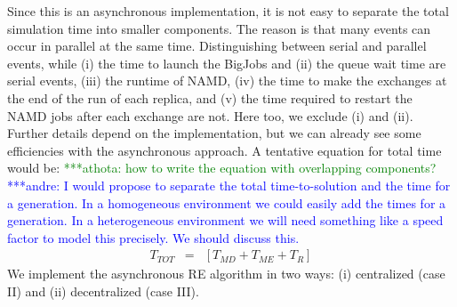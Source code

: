 \documentclass[a4paper,10pt]{article}
\newcommand{\alnote}[1]{ {\textcolor{blue} { ***andre: #1 }}}
\newcommand{\athotanote}[1]{ {\textcolor{green} { ***athota: #1 }}}
\newcommand{\alnote}[1]{}
\newcommand{\athotanote}[1]{}
\begin{document}
Since this is an asynchronous implementation, it is not easy to separate the total simulation time into smaller components. The reason is that many events can occur in parallel at the same time. Distinguishing between serial and parallel events, while (i) the time to launch the BigJobs and (ii) the queue wait time are serial events, (iii) the runtime of NAMD, (iv) the time to make the exchanges at the end of the run of each replica, and (v) the time required to restart the NAMD jobs after each exchange are not. %
Here too, we exclude (i) and (ii). Further details depend on the implementation, but we can already see some efficiencies with the asynchronous approach. A tentative equation for total time would be:
\athotanote{how to write the equation with overlapping components?}
\alnote{I would propose to separate the total time-to-solution and the time for a generation. 
In a homogeneous environment we could easily add the times for a generation. In a heterogeneous 
environment we will need something like a speed factor to model this precisely. We should discuss this.}
  \begin{eqnarray}
T_{TOT} &=& [T_{MD} + T_{ME} + T_{R}]
\label{eq:equation 1}
\end{eqnarray}
We implement the asynchronous RE algorithm in two ways: (i) centralized (case II) and (ii) decentralized (case III).

\end{document}
